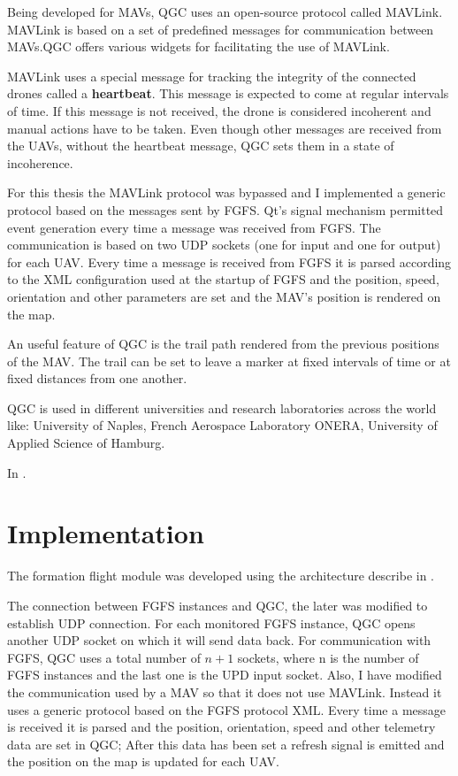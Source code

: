Being developed for MAVs,  QGC uses
an open-source protocol called MAVLink. MAVLink is based on a set of predefined
messages for communication between MAVs.QGC offers various widgets for facilitating
the use of MAVLink.

MAVLink uses a special message for tracking the integrity of the connected drones
called a \textbf{heartbeat}. This message is expected to come at regular intervals
of time. If this message is not received, the drone is considered incoherent
and manual actions have to be taken. Even though other messages are received from
the UAVs, without the heartbeat message, QGC sets them in a state of incoherence.

For this thesis the MAVLink protocol was bypassed and I implemented a generic
protocol based on the messages sent by FGFS. Qt's signal mechanism permitted
event generation every time a message was received from FGFS. The communication
is based on two UDP sockets (one for input and one for output) for each UAV. 
Every time a message is received from FGFS it is parsed according to the XML 
configuration used at the startup of FGFS and the position, speed, orientation
and other parameters are set and the MAV's position is rendered on the map.

An useful feature of QGC is the trail path rendered from the previous positions
of the MAV. The trail can be set to leave a marker at fixed intervals of time
or at fixed distances from one another.

QGC is used in different universities and research laboratories across the world 
like: University of Naples, French Aerospace Laboratory ONERA,  University of 
Applied Science of Hamburg.

In .


\section{Implementation}
\label{sec:code}

The formation flight module was developed using the architecture describe in 
.

The connection between FGFS instances and QGC, the later was modified to establish
UDP connection. For each monitored FGFS instance,  QGC opens another UDP socket
on which it will send data back. For communication with FGFS, QGC uses a total
number of $n+1$ sockets, where n is the number of FGFS instances and the last
one is the UPD input socket. Also, I have modified the communication used
by a MAV so that it does not use MAVLink. Instead it uses a generic protocol
based on the FGFS protocol XML. Every time a message is received it is parsed
and the position, orientation, speed and other telemetry data are set in 
QGC; After this data has been set a refresh signal is emitted and the position
on the map is updated for each UAV.

